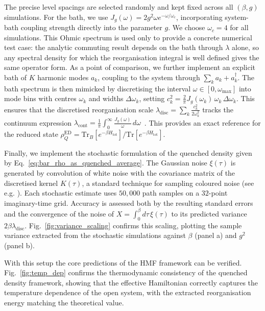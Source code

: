 \documentclass[aps,prl,twocolumn,superscriptaddress,showpacs,floatfix]{revtex4-2}
\newcommand{\Tr}{\mathrm{Tr}}
\begin{document}
The precise level spacings are selected randomly and kept fixed across all $(\beta,g)$ simulations. For the bath, we use $J_g(\omega)=2 g^2\omega e^{-\omega/\omega_c}$, incorporating system-bath coupling strength directly into the parameter $g$. We choose $\omega_c=4$ for all simulations. This Ohmic spectrum is used only to provide a concrete numerical test case: the analytic commuting result depends on the bath through $\lambda$ alone, so any spectral density for which the reorganisation integral is well defined gives the same operator form. As a point of comparison, we further implement an explicit bath of $K$ harmonic modes $a_k$, coupling to the system through $\sum_k a_k +a_k^\dagger$. The bath spectrum is then mimicked by discretising the interval $\omega\in[0, \omega_{\max}]$ into mode bins with centres $\omega_k$ and widths $\Delta\omega_k$, setting $c_k^2=\frac{2}{\pi}J_g(\omega_k)\,\omega_k\,\Delta\omega_k$. This ensures that the discretised reorganisation scale $\lambda_{\mathrm{disc}}=\sum_k\frac{c_k^2}{2\omega_k^2}$ tracks the continuum expression $\lambda_{\mathrm{cont}}=\frac{1}{\pi}\int_0^\infty\frac{J_g(\omega)}{\omega}\,d\omega$~\cite{weissQuantumDissipativeSystems2012}. This provides an exact reference for the reduced state $\rho_Q^{\mathrm{ED}}=\Tr_B[e^{-\beta H_{\mathrm{tot}}}]/\Tr[e^{-\beta H_{\mathrm{tot}}}]$. 

Finally, we implement the stochastic formulation of the quenched density given by Eq.~\eqref{eq:bar_rho_as_quenched_average}. The Gaussian noise $\xi(\tau)$ is generated by convolution of white noise with the covariance matrix of the discretised kernel $K(\tau)$, a standard technique for sampling coloured noise (see e.g. \cite{mccaulDrivingSpinbosonModels2018a}). Each stochastic estimate uses $50{,}000$ path samples on a $32$-point imaginary-time grid. Accuracy is assessed both by the resulting standard errors and the convergence of the noise of $X=\int_0^\beta d\tau\,\xi(\tau)$ to its  predicted variance $2\beta\lambda_{\mathrm{disc}}$. Fig.~\ref{fig:variance_scaling} confirms this scaling, plotting the sample variance extracted from the stochastic simulations against $\beta$ (panel a) and $g^2$ (panel b).

With this setup the core predictions of the HMF framework can be verified. 
Fig.~\ref{fig:temp_dep} confirms the thermodynamic consistency of the quenched density framework, showing that the effective Hamiltonian correctly captures the temperature dependence of the open system, with the extracted reorganisation energy matching the theoretical value. 
\end{document}
